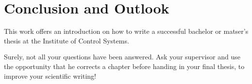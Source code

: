 \section{Conclusion and Outlook}

This work offers an introduction on how to write a successful bachelor or matser's thesis at the Institute of Control Systems.

Surely, not all your questions have been answered. Ask your supervisor and use the opportunity that he corrects a chapter before handing in your final thesis, to improve your scientific writing!